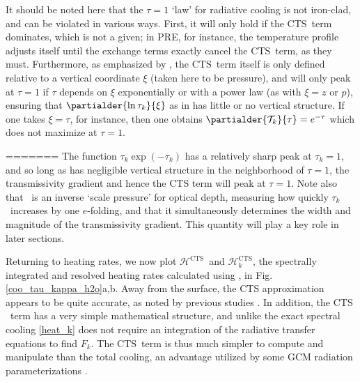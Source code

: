 \documentclass[10pt]{article}
\newcommand{\trans}{\ensuremath{\mathcal{T}}}
\newcommand{\ch}{\ensuremath{\mathcal{H}}}
\newcommand{\chcts}{\ensuremath{\mathcal{H}^\CTS}}
\newcommand{\chkcts}{\ensuremath{\ch_k^\CTS}}
\newcommand{\tauk}{\ensuremath{\tau_k}}
\newcommand{\CTS}{\ensuremath{\mathrm{CTS}}}
\begin{document}
 It should be noted here that the $\tau=1$ `law' for radiative cooling is not iron-clad, and can be violated in various ways. First, it will only hold if the \CTS\ term dominates, which is not a given; in PRE, for instance, the temperature profile adjusts itself until the exchange terms exactly cancel the \CTS\ term, as they must. Furthermore,  as emphasized by \cite{huang2014}, the \CTS\ term itself is only defined relative to a vertical coordinate $\xi$ (taken here to be pressure),  and  will only peak at $\tau=1$ if $\tau$ depends on $\xi$ exponentially or with a power law (as with $\xi=z$ or $p$), ensuring that $\partialder{\ln \tauk}{\xi}$ as in  has little or no vertical structure. If one takes $\xi=\tau$, for instance, then one obtains $\partialder{\trans_k}{\tau} = e^{-\tau}$ which does not maximize at $\tau=1$. 
 

%
=======
 The function $\tauk \exp(-\tauk)$ has a relatively sharp peak at $\tauk=1$, and so long as \partialder{\ln\tauk}{p}  has negligible vertical structure in the neighborhood of $\tau=1$, the transmissivity gradient and hence the CTS term will peak 
at $\tau=1$. Note also that \partialder{\ln\tauk}{p}\ is an inverse  `scale pressure' for optical depth, measuring how quickly \tauk\ increases by one $e$-folding, and that it simultaneously determines the width and magnitude of the transmissivity gradient. This quantity will play a key role in later sections.

Returning to heating rates, we now plot \chcts\ and \chkcts, the spectrally integrated and resolved heating rates calculated using  ,  in Fig. \ref{coo_tau_kappa_h2o}a,b. Away from the surface, the CTS approximation appears to be quite accurate, as noted by previous studies \citep[e.g.][]{clough1992,rodgers1966}.  In addition, the \CTS\ term has a very simple mathematical structure,  and unlike the exact spectral cooling \eqref{heat_k} does not require an integration of the radiative transfer equations to find $F_k$. The \CTS\ term is thus much simpler to compute and manipulate than the total cooling, an advantage utilized by some GCM radiation parameterizations  \citep[e.g.][]{fels1980}.
\end{document}
